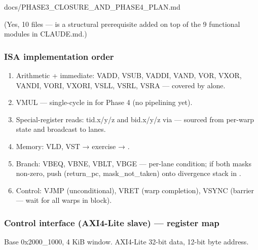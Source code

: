 \begin{relocated}{docs/PHASE3_CLOSURE_AND_PHASE4_PLAN.md}
{}

(Yes, 10 files ---  is a structural prerequisite added
on top of the 9 functional modules in CLAUDE.md.)

\subsubsection{ISA implementation order}\label{ds:ch:phase3-closure-phase4-plan:53-isa-implementation-order}

\begin{enumerate}
\def\labelenumi{\arabic{enumi}.}
\tightlist
\item
  Arithmetic + immediate: VADD, VSUB, VADDI, VAND, VOR, VXOR, VANDI,
  VORI, VXORI, VSLL, VSRL, VSRA --- covered by 
  alone.
\item
  VMUL --- single-cycle in  for Phase 4 (no
  pipelining yet).
\item
  Special-register reads: tid.x/y/z and bid.x/y/z via  ---
  sourced from  per-warp state and broadcast to
  lanes.
\item
  Memory: VLD, VST → exercise  →
  .
\item
  Branch: VBEQ, VBNE, VBLT, VBGE --- per-lane condition; if both masks
  non-zero, push (return\_\allowbreak{}pc,
  mask\_\allowbreak{}not\_\allowbreak{}taken) onto divergence stack in
  .
\item
  Control: VJMP (unconditional), VRET (warp completion), VSYNC (barrier
  --- wait for all warps in block).
\end{enumerate}

\subsubsection{Control interface (AXI4-Lite slave) --- register map}\label{ds:ch:phase3-closure-phase4-plan:54-control-interface-axi4-lite-slave-register-map}

Base 0x2000\_\allowbreak{}1000, 4 KiB window. AXI4-Lite 32-bit data,
12-bit byte address.

{\small\setlength{\tabcolsep}{4pt}

}
\end{relocated}
